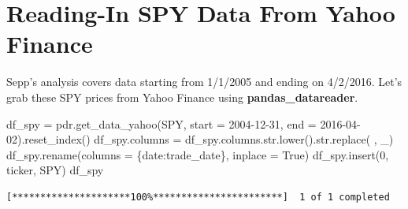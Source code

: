 \documentclass[
  letterpaper,
  DIV=11,
  numbers=noendperiod]{scrreprt}
\newenvironment{Shaded}{\begin{snugshade}}{\end{snugshade}}
\newcommand{\BuiltInTok}[1]{\textcolor[rgb]{0.00,0.23,0.31}{#1}}
\newcommand{\DecValTok}[1]{\textcolor[rgb]{0.68,0.00,0.00}{#1}}
\newcommand{\NormalTok}[1]{\textcolor[rgb]{0.00,0.23,0.31}{#1}}
\newcommand{\OperatorTok}[1]{\textcolor[rgb]{0.37,0.37,0.37}{#1}}
\newcommand{\StringTok}[1]{\textcolor[rgb]{0.13,0.47,0.30}{#1}}
\newcommand{\VariableTok}[1]{\textcolor[rgb]{0.07,0.07,0.07}{#1}}
\begin{document}
\hypertarget{reading-in-spy-data-from-yahoo-finance}{%
\section{Reading-In SPY Data From Yahoo
Finance}\label{reading-in-spy-data-from-yahoo-finance}}

Sepp's analysis covers data starting from 1/1/2005 and ending on
4/2/2016. Let's grab these SPY prices from Yahoo Finance using
\textbf{pandas\_datareader}.

\begin{Shaded}
\begin{Highlighting}[]
\NormalTok{df\_spy }\OperatorTok{=}\NormalTok{ pdr.get\_data\_yahoo(}\StringTok{\textquotesingle{}SPY\textquotesingle{}}\NormalTok{, start }\OperatorTok{=} \StringTok{\textquotesingle{}2004{-}12{-}31\textquotesingle{}}\NormalTok{, end }\OperatorTok{=} \StringTok{\textquotesingle{}2016{-}04{-}02\textquotesingle{}}\NormalTok{).reset\_index()}
\NormalTok{df\_spy.columns }\OperatorTok{=}\NormalTok{ df\_spy.columns.}\BuiltInTok{str}\NormalTok{.lower().}\BuiltInTok{str}\NormalTok{.replace(}\StringTok{\textquotesingle{} \textquotesingle{}}\NormalTok{, }\StringTok{\textquotesingle{}\_\textquotesingle{}}\NormalTok{)}
\NormalTok{df\_spy.rename(columns }\OperatorTok{=}\NormalTok{ \{}\StringTok{\textquotesingle{}date\textquotesingle{}}\NormalTok{:}\StringTok{\textquotesingle{}trade\_date\textquotesingle{}}\NormalTok{\}, inplace }\OperatorTok{=} \VariableTok{True}\NormalTok{)}
\NormalTok{df\_spy.insert(}\DecValTok{0}\NormalTok{, }\StringTok{\textquotesingle{}ticker\textquotesingle{}}\NormalTok{, }\StringTok{\textquotesingle{}SPY\textquotesingle{}}\NormalTok{)}
\NormalTok{df\_spy}
\end{Highlighting}
\end{Shaded}

\begin{verbatim}
[*********************100%***********************]  1 of 1 completed
\end{verbatim}
\end{document}
